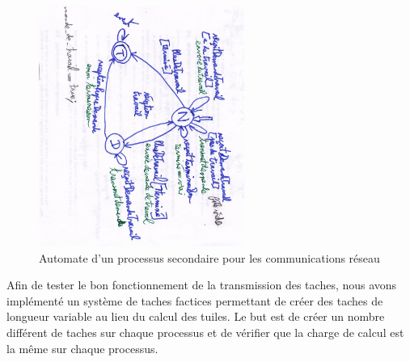 \begin{figure}[H]
\centering
\includegraphics[width=0.6\textwidth]{automate.jpg}
\caption{Automate d'un processus secondaire pour les communications réseau}
\label{fig:diff}
\end{figure}

Afin de tester le bon fonctionnement de la transmission des taches, nous avons implémenté un système de taches factices permettant de créer des taches de longueur variable au lieu du calcul des tuiles. Le but est de créer un nombre différent de taches sur chaque processus et de vérifier que la charge de calcul est la même sur chaque processus.

